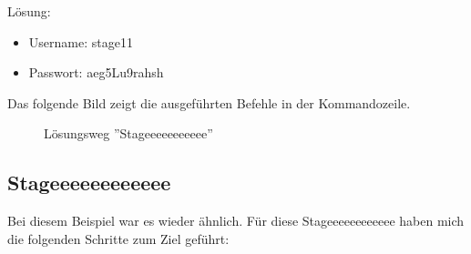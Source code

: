 \documentclass[12pt, a4paper, titlepage, oneside]{scrartcl}
\begin{document}
	Lösung:
	\begin{itemize}
		\item Username: stage11

		\item Passwort: aeg5Lu9rahsh
	\end{itemize}

	Das folgende Bild zeigt die ausgeführten Befehle in der Kommandozeile.

	\begin{figure}[h!]
		\centering
		\caption{Lösungsweg ''Stageeeeeeeeeee''}
		\label{fig:stageeeeeeeeeee_solution}
	\end{figure}

	\newpage

	\subsection{Stageeeeeeeeeeee}
	Bei diesem Beispiel war es wieder ähnlich. Für diese Stageeeeeeeeeeee haben
	mich die folgenden Schritte zum Ziel geführt:
\end{document}
